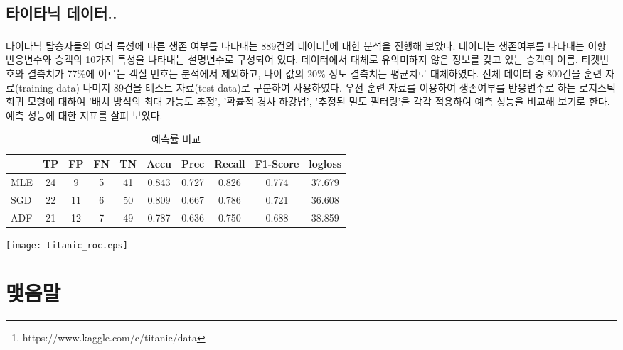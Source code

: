 \documentclass[oneside,b5paper,11pt]{article} %
\begin{document}
\subsection{타이타닉 데이터..}
 타이타닉 탑승자들의 여러 특성에 따른 생존 여부를 나타내는 889건의 데이터\footnote{https://www.kaggle.com/c/titanic/data}에 대한 분석을 진행해 보았다. 데이터는 생존여부를 나타내는 이항 반응변수와 승객의 10가지 특성을 나타내는 설명변수로 구성되어 있다. 데이터에서 대체로 유의미하지 않은 정보를 갖고 있는 승객의 이름, 티켓번호와 결측치가 77$\%$에 이르는 객실 번호는 분석에서 제외하고, 나이 값의 20$\%$ 정도 결측치는 평균치로 대체하였다. 전체 데이터 중 800건을 훈련 자료(training data) 나머지 89건을 테스트 자료(test data)로 구분하여 사용하였다.
 우선 훈련 자료를 이용하여 생존여부를 반응변수로 하는 로지스틱 회귀 모형에 대하여 '배치 방식의 최대 가능도 추정', '확률적 경사 하강법', '추정된 밀도 필터링'을 각각 적용하여 예측 성능을 비교해 보기로 한다. 예측 성능에 대한 지표를 살펴 보았다.


\begin{table}[ht]
	\centering
	\begin{tabular}{cccccccccc}
	\hline\hline
	\textbf{} & \textbf{TP} & \textbf{FP} & \textbf{FN} & \textbf{TN} & \textbf{Accu} & \textbf{Prec} & \textbf{Recall} & \textbf{F1-Score} & \textbf{logloss}  \\ 
	\hline 
	
	\multicolumn {1}{l|}{MLE} & 24 & 9  & 5 & 41 & 0.843 & 0.727 & 0.826 & 0.774 & 37.679 \\ \hline
	\multicolumn {1}{l|}{SGD} & 22 & 11 & 6 & 50 & 0.809 & 0.667 & 0.786 & 0.721 & 36.608 \\ \hline
	\multicolumn {1}{l|}{ADF} & 21 & 12 & 7 & 49 & 0.787 & 0.636 & 0.750 & 0.688 & 38.859 \\ \hline

	\hline
	\end{tabular}
	
	\caption[예측률 비교]{예측률 비교}
\end{table}



\begin{center}
\texttt{[image: titanic\_roc.eps]} %
\end{center}


\section{맺음말}
\end{document}
